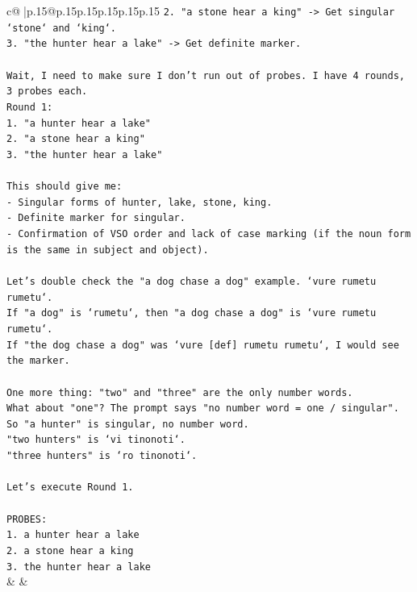 \documentclass{article}
\begin{document}
{\begin{supertabular}{c@{$\;$}|p{.15\linewidth}@{}p{.15\linewidth}p{.15\linewidth}p{.15\linewidth}p{.15\linewidth}p{.15\linewidth}}
{{{\texttt{2. "a stone hear a king" {-}> Get singular `stone` and `king`.} \\
\texttt{3. "the hunter hear a lake" {-}> Get definite marker.} \\
\\ 
\texttt{Wait, I need to make sure I don't run out of probes. I have 4 rounds, 3 probes each.} \\
\texttt{Round 1:} \\
\texttt{1. "a hunter hear a lake"} \\
\texttt{2. "a stone hear a king"} \\
\texttt{3. "the hunter hear a lake"} \\
\\ 
\texttt{This should give me:} \\
\texttt{{-} Singular forms of hunter, lake, stone, king.} \\
\texttt{{-} Definite marker for singular.} \\
\texttt{{-} Confirmation of VSO order and lack of case marking (if the noun form is the same in subject and object).} \\
\\ 
\texttt{Let's double check the "a dog chase a dog" example. `vure rumetu rumetu`.} \\
\texttt{If "a dog" is `rumetu`, then "a dog chase a dog" is `vure rumetu rumetu`.} \\
\texttt{If "the dog chase a dog" was `vure {[}def{]} rumetu rumetu`, I would see the marker.} \\
\\ 
\texttt{One more thing: "two" and "three" are the only number words.} \\
\texttt{What about "one"? The prompt says "no number word = one / singular".} \\
\texttt{So "a hunter" is singular, no number word.} \\
\texttt{"two hunters" is `vi tinonoti`.} \\
\texttt{"three hunters" is `ro tinonoti`.} \\
\\ 
\texttt{Let's execute Round 1.} \\
\\ 
\texttt{PROBES:} \\
\texttt{1. a hunter hear a lake} \\
\texttt{2. a stone hear a king} \\
\texttt{3. the hunter hear a lake} \\
            }
        }
    }
    & & \\ \\


\end{supertabular}}
\end{document}
